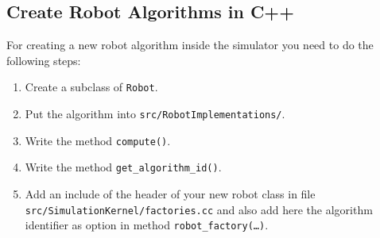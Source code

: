 \subsection{Create Robot Algorithms in C++}
For creating a new robot algorithm inside the simulator you need to do the following steps:
\begin{enumerate}
	\item Create a subclass of \texttt{Robot}.
	\item Put the algorithm into \texttt{src/RobotImplementations/}.
	\item Write the method \texttt{compute()}.
	\item Write the method \texttt{get\_algorithm\_id()}.
	\item Add an include of the header of your new robot class in file \texttt{src/SimulationKernel/factories.cc} and also add here the algorithm identifier as option in method \texttt{robot\_factory(\dots)}.\\
\end{enumerate}


